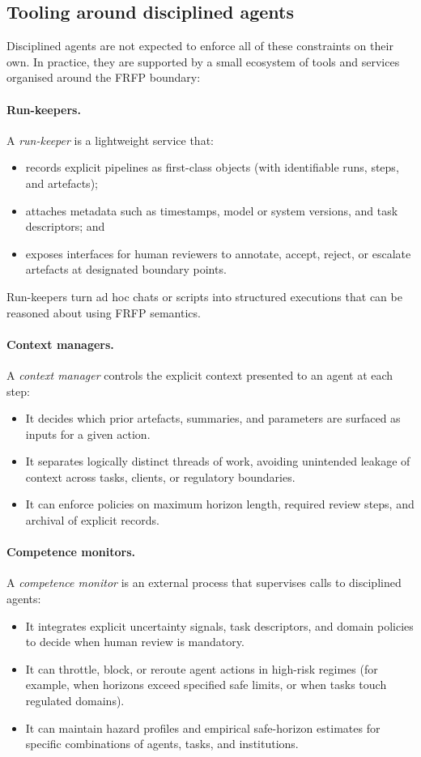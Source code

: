\subsection{Tooling around disciplined agents}

Disciplined agents are not expected to enforce all of these constraints on their own. In practice, they are supported by a small ecosystem of tools and services organised around the FRFP boundary:

\paragraph{Run-keepers.}
A \emph{run-keeper} is a lightweight service that:
\begin{itemize}
  \item records explicit pipelines as first-class objects (with identifiable runs, steps, and artefacts);
  \item attaches metadata such as timestamps, model or system versions, and task descriptors; and
  \item exposes interfaces for human reviewers to annotate, accept, reject, or escalate artefacts at designated boundary points.
\end{itemize}
Run-keepers turn ad hoc chats or scripts into structured executions that can be reasoned about using FRFP semantics.

\paragraph{Context managers.}
A \emph{context manager} controls the explicit context presented to an agent at each step:
\begin{itemize}
  \item It decides which prior artefacts, summaries, and parameters are surfaced as inputs for a given action.
  \item It separates logically distinct threads of work, avoiding unintended leakage of context across tasks, clients, or regulatory boundaries.
  \item It can enforce policies on maximum horizon length, required review steps, and archival of explicit records.
\end{itemize}

\paragraph{Competence monitors.}
A \emph{competence monitor} is an external process that supervises calls to disciplined agents:
\begin{itemize}
  \item It integrates explicit uncertainty signals, task descriptors, and domain policies to decide when human review is mandatory.
  \item It can throttle, block, or reroute agent actions in high-risk regimes (for example, when horizons exceed specified safe limits, or when tasks touch regulated domains).
  \item It can maintain hazard profiles and empirical safe-horizon estimates for specific combinations of agents, tasks, and institutions.
\end{itemize}

